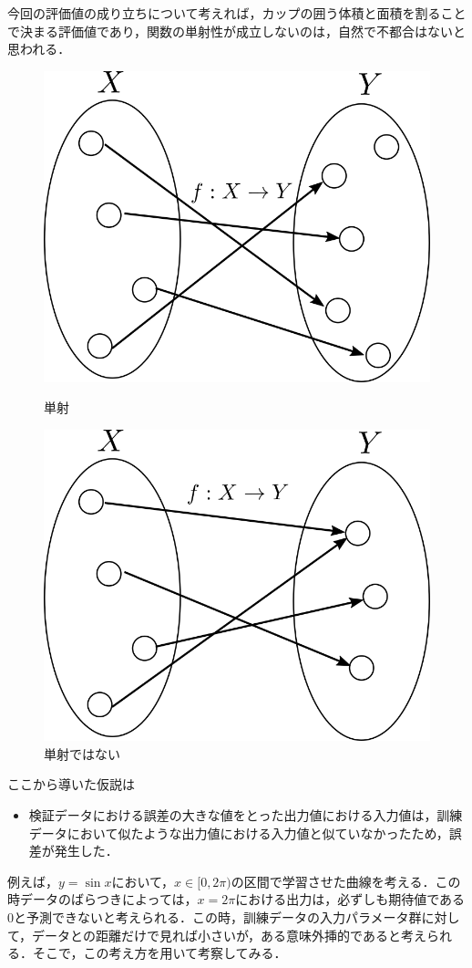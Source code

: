 \documentclass[16.7pt]{jsarticle}
\begin{document}
		今回の評価値の成り立ちについて考えれば，カップの囲う体積と面積を割ることで決まる評価値であり，関数の単射性が成立しないのは，自然で不都合はないと思われる．
		\begin{figure}[h]
			\centering
			\begin{minipage}{0.45\hsize}
				\centering
				\includegraphics[width= 0.65\columnwidth]{./figure/Injection.png}
				\caption{単射}
			\end{minipage}
			\begin{minipage}{0.45\hsize}
				\centering
				\includegraphics[width= 0.65\columnwidth]{./figure/Surjection.png}
				\caption{単射ではない}
			\end{minipage}
		\end{figure}
		
		ここから導いた仮説は
		\begin{itemize}
			\item 検証データにおける誤差の大きな値をとった出力値における入力値は，訓練データにおいて似たような出力値における入力値と似ていなかったため，誤差が発生した．
		\end{itemize}
		例えば，$ y=\sin x $において，$ x \in [0,2\pi) $の区間で学習させた曲線を考える．この時データのばらつきによっては，$ x = 2\pi $における出力は，必ずしも期待値である$ 0 $と予測できないと考えられる．この時，訓練データの入力パラメータ群に対して，データとの距離だけで見れば小さいが，ある意味外挿的であると考えられる．そこで，この考え方を用いて考察してみる．
\end{document}

